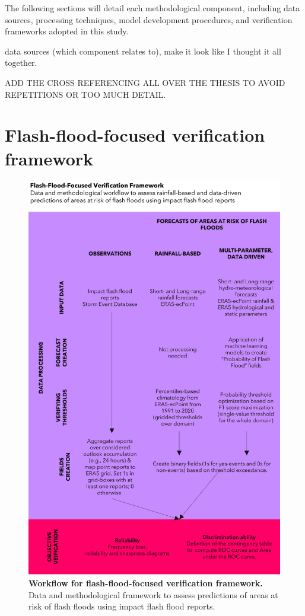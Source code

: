 The following sections will detail each methodological component, including data sources, processing techniques, model development procedures, and verification frameworks adopted in this study. 

data sources (which component relates to), make it look like I thought it all together.

ADD THE CROSS REFERENCING ALL OVER THE THESIS TO AVOID REPETITIONS OR TOO MUCH DETAIL.


\section{Flash-flood-focused verification framework}

\begin{figure}[htbp]
\centering
\includegraphics[width=\textwidth]{workflow_verif_framework.png}
\caption{\textbf{Workflow for flash-flood-focused verification framework.} Data and methodological framework to assess predictions of areas at risk of flash floods using impact flash flood reports.}
\label{fig:workflow_verif_framework}
\end{figure}

